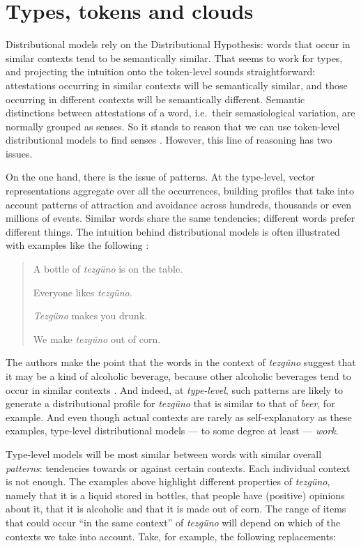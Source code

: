 \documentclass[
]{book}
\begin{document}
\hypertarget{naive}{%
\section{Types, tokens and clouds}\label{naive}}

Distributional models rely on the Distributional Hypothesis: words that occur in similar contexts tend to be semantically similar. That seems to work for types, and projecting the intuition onto the token-level sounds straightforward: attestations occurring in similar contexts will be semantically similar, and those occurring in different contexts will be semantically different. Semantic distinctions between attestations of a word, i.e.~their semasiological variation, are normally grouped as senses. So it stands to reason that we can use token-level distributional models to find senses \autocite{schutze_1998,yarowsky_1995}. However, this line of reasoning has two issues.

On the one hand, there is the issue of patterns.
At the type-level, vector representations aggregate over all the occurrences, building profiles that take into account patterns of attraction and avoidance across hundreds, thousands or even millions of events. Similar words share the same tendencies; different words prefer different things.
The intuition behind distributional models is often illustrated with examples like the following \autocite[613]{pantel.lin_2002}:

\begin{quote}
A bottle of \emph{tezgüno} is on the table.

Everyone likes \emph{tezgüno}.

\emph{Tezgüno} makes you drunk.

We make \emph{tezgüno} out of corn.
\end{quote}

The authors make the point that the words in the context of \emph{tezgüno} suggest that it may be a kind of alcoholic beverage, because other alcoholic beverages tend to occur in similar contexts \autocite[613]{pantel.lin_2002}. And indeed, at \emph{type-level}, such patterns are likely to generate a distributional profile for \emph{tezgüno} that is similar to that of \emph{beer}, for example.
And even though actual contexts are rarely as self-explanatory as these examples, type-level distributional models --- to some degree at least --- \emph{work}.

Type-level models will be most similar between words with similar overall \emph{patterns}: tendencies towards or against certain contexts. Each individual context is not enough. The examples above highlight different properties of \emph{tezgüno}, namely that it is a liquid stored in bottles, that people have (positive) opinions about it, that it is alcoholic and that it is made out of corn. The range of items that could occur ``in the same context'' of \emph{tezgüno} will depend on which of the contexts we take into account. Take, for example, the following replacements:
\end{document}
